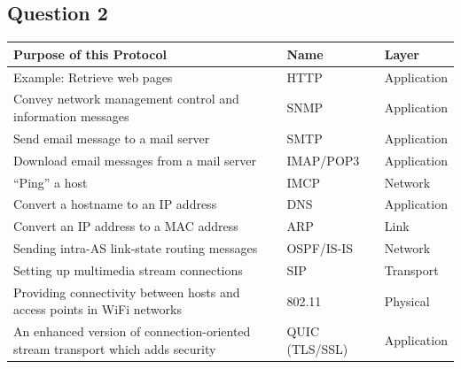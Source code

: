 \documentclass[12pt, a4paper]{article}
\begin{document}
\subsection{Question 2}
\begin{table}[H]
	\centering
	\begin{tabular}{p{10cm}ll}
		\toprule
		Purpose of this Protocol                                                        & Name           & Layer       \\ \midrule
		Example: Retrieve web pages                                                     & HTTP           & Application \\
		Convey network management control and information messages                      & SNMP           & Application \\
		Send email message to a mail server                                             & SMTP           & Application \\
		Download email messages from a mail server                                      & IMAP/POP3      & Application \\
		``Ping'' a host                                                                 & IMCP           & Network     \\
		Convert a hostname to an IP address                                             & DNS            & Application \\
		Convert an IP address to a MAC address                                          & ARP            & Link        \\
		Sending intra-AS link-state routing messages                                    & OSPF/IS-IS     & Network     \\
		Setting up multimedia stream connections                                        & SIP            & Transport   \\
		Providing connectivity between hosts and access points in WiFi networks         & 802.11         & Physical    \\
		An enhanced version of connection-oriented stream transport which adds security & QUIC (TLS/SSL) & Application
	\end{tabular}
\end{table}
\end{document}
